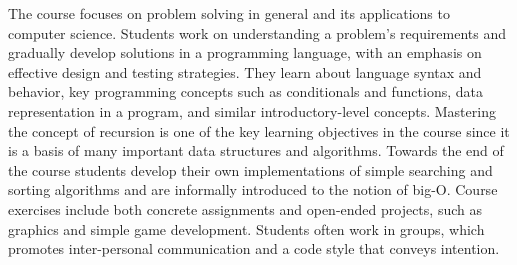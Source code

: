 \documentclass[submission,copyright,creativecommons]{eptcs}
\newcommand{\allcomments}[1]{{#1}}
\newcommand{\elenacomment}[1]{{\bf \textcolor{ForestGreen}{\allcomments{{#1}}}}}
\newcommand{\stephencomment}[1]{{\bf \color{StephensBlue}{\allcomments{{#1}}}}} %
\newcommand{\joecomment}[1]{{\bf \color{JoesGold}{\allcomments{{#1}}}}}
\begin{document}
The course focuses on problem solving in general and  its applications to computer science.
Students work on understanding a problem's requirements and gradually develop solutions in a programming language, with an emphasis on effective design and testing strategies. They learn about language syntax and behavior, key programming concepts such as conditionals and functions, data representation in a program, and similar introductory-level concepts. Mastering the concept of recursion is one of the key learning objectives in the course since it is a basis of many important data structures and algorithms. 
Towards the end of the course students develop their own implementations of simple searching and sorting algorithms and are informally introduced to the notion of big-O. Course exercises include both concrete assignments and open-ended projects, such as graphics and simple game development. Students often work in groups, which promotes inter-personal communication and a code style that conveys intention. 

\end{document}
